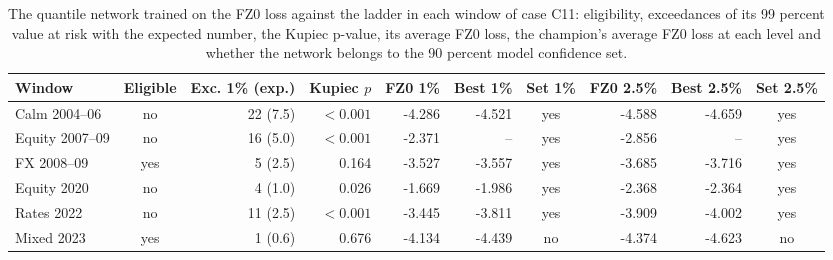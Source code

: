\begin{table}[htbp]
\centering
\scriptsize
\setlength{\tabcolsep}{2.0pt}
\caption{The quantile network trained on the FZ0 loss against the ladder in each window of case C11: eligibility, exceedances of its 99 percent value at risk with the expected number, the Kupiec p-value, its average FZ0 loss, the champion's average FZ0 loss at each level and whether the network belongs to the 90 percent model confidence set.}
\label{tab:market-nn}
\begin{tabular}{lcrrrrcrrc}
\toprule
Window & Eligible & Exc. 1\% (exp.) & Kupiec $p$ & FZ0 1\% & Best 1\% & Set 1\% & FZ0 2.5\% & Best 2.5\% & Set 2.5\% \\
\midrule
Calm 2004--06 & no & 22 (7.5) & $<0.001$ & -4.286 & -4.521 & yes & -4.588 & -4.659 & yes \\
Equity 2007--09 & no & 16 (5.0) & $<0.001$ & -2.371 & -- & yes & -2.856 & -- & yes \\
FX 2008--09 & yes & 5 (2.5) & 0.164 & -3.527 & -3.557 & yes & -3.685 & -3.716 & yes \\
Equity 2020 & no & 4 (1.0) & 0.026 & -1.669 & -1.986 & yes & -2.368 & -2.364 & yes \\
Rates 2022 & no & 11 (2.5) & $<0.001$ & -3.445 & -3.811 & yes & -3.909 & -4.002 & yes \\
Mixed 2023 & yes & 1 (0.6) & 0.676 & -4.134 & -4.439 & no & -4.374 & -4.623 & no \\
\bottomrule
\end{tabular}
\end{table}
